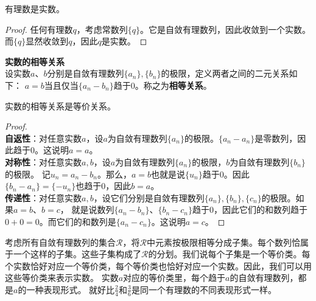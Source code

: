 \documentclass[12pt,UTF8]{ctexbook}
\begin{document}
\begin{appendix}
\begin{tm}\label{tm:a-1-5}
    有理数是实数。
\end{tm}
\begin{proof}
    任何有理数$q$，考虑常数列$\{q\}$。它是自敛有理数列，因此收敛到一个实数。而$\{q\}$显然收敛到$q$，因此$q$是实数。
\end{proof}

\begin{df}\textbf{实数的相等关系}\\
    设实数$a$、$b$分别是自敛有理数列$\{a_n\}, \{b_n\}$的极限，定义两者之间的二元关系如下：
    $a = b$当且仅当$\{a_n - b_n\}$趋于$0$。称之为\textbf{相等关系}。
\end{df}

\begin{tm}\label{tm:a-1-10}
    实数的相等关系是等价关系。
\end{tm}
\begin{proof}
    \mbox{} \\
    \textbf{自返性}：对任意实数$a$，设$a$为自敛有理数列$\{a_n\}$的极限。$\{a_n - a_n\}$是零数列，因此趋于$0$。这说明$a = a$。\\
    \textbf{对称性}：对任意实数$a, b$，设$a$为自敛有理数列$\{a_n\}$的极限，$b$为自敛有理数列$\{b_n\}$的极限。
    记$u_n = a_n - b_n$。那么，$a = b$也就是说$\{u_n\}$趋于$0$。因此$\{b_n - a_n\} = \{-u_n\}$也趋于$0$，因此$b = a$。\\
    \textbf{传递性}：对任意实数$a, b$，设它们分别是自敛有理数列$\{a_n\}, \{b_n\}, \{c_n\}$的极限。如果$a=b$、$b=c$，
    就是说数列$\{a_n - b_n\}$、$\{b_n - c_n\}$趋于$0$，因此它们的和数列趋于$0+0=0$。而它们的和数列是$\{a_n - c_n\}$。这说明$a=c$。
\end{proof}

考虑所有自敛有理数列的集合$\mathcal{R}$，将$\mathcal{R}$中元素按极限相等分成子集。每个数列恰属于一个这样的子集。这些子集构成了$\mathcal{R}$的分划。我们说每个子集是一个等价类。每个实数恰好对应一个等价类，每个等价类也恰好对应一个实数。因此，我们可以用这些等价类来表示实数。
实数$a$对应的等价类里，每个趋于$a$的自敛有理数列，都是$a$的一种表现形式。
就好比$\frac{2}{4}$和$\frac{3}{6}$是同一个有理数的不同表现形式一样。


\end{appendix}
\end{document}
